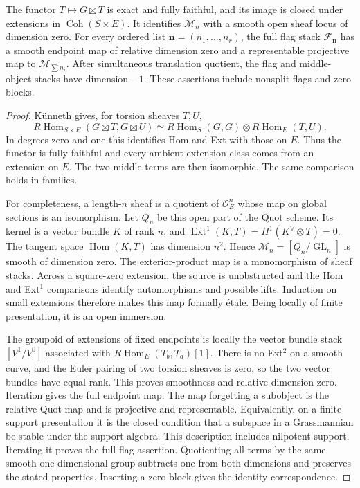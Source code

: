 \begin{proposition}\label{gh:sector}
The functor $T\mapsto G\boxtimes T$ is exact and fully faithful, and its
image is closed under extensions in $\operatorname{Coh}(S\times E)$.
It identifies $\mathcal M_n$ with a smooth open sheaf locus of dimension
zero. For every ordered list $\mathbf n=(n_1,\ldots,n_r)$, the full flag
stack $\mathcal F_{\mathbf n}$ has a smooth endpoint map of relative
dimension zero and a representable projective map to
$\mathcal M_{\sum n_i}$. After simultaneous translation quotient, the
flag and middle-object stacks have dimension $-1$. These assertions
include nonsplit flags and zero blocks.
\end{proposition}
\begin{proof}
K\"unneth gives, for torsion sheaves $T,U$,
\[
 R\operatorname{Hom}_{S\times E}(G\boxtimes T,G\boxtimes U)
 \simeq R\operatorname{Hom}_S(G,G)
             \otimes R\operatorname{Hom}_E(T,U).
\]
In degrees zero and one this identifies Hom and Ext with those on $E$.
Thus the functor is fully faithful and every ambient extension class
comes from an extension on $E$. The two middle terms are then
isomorphic. The same comparison holds in families.

For completeness, a length-$n$ sheaf is a quotient of
$\mathcal O_E^n$ whose map on global sections is an isomorphism.
Let $Q_n$ be this open part of the Quot scheme. Its kernel is a vector
bundle $K$ of rank $n$, and
$\operatorname{Ext}^1(K,T)=H^1(K^\vee\otimes T)=0$.
The tangent space $\operatorname{Hom}(K,T)$ has dimension $n^2$.
Hence $\mathcal M_n=[Q_n/\operatorname{GL}_n]$ is smooth of dimension
zero. The exterior-product map is a monomorphism of sheaf stacks.
Across a square-zero extension, the source is unobstructed and the
Hom and Ext$^1$ comparisons identify automorphisms and possible lifts.
Induction on small extensions therefore makes this map formally
\'etale. Being locally of finite presentation, it is an open immersion.

The groupoid of extensions of fixed endpoints is locally the vector
bundle stack $[V^1/V^0]$ associated with
$R\operatorname{Hom}_E(T_b,T_a)[1]$.
There is no Ext$^2$ on a smooth curve, and the Euler pairing of two
torsion sheaves is zero, so the two vector bundles have equal rank.
This proves smoothness and relative dimension zero. Iteration gives the
full endpoint map. The map forgetting a subobject is the relative Quot
map and is projective and representable. Equivalently, on a finite
support presentation it is the closed condition that a subspace in a
Grassmannian be stable under the support algebra. This description
includes nilpotent support. Iterating it proves the full flag assertion.
Quotienting all terms by the same smooth one-dimensional group subtracts
one from both dimensions and preserves the stated properties.
Inserting a zero block gives the identity correspondence.
\end{proof}

